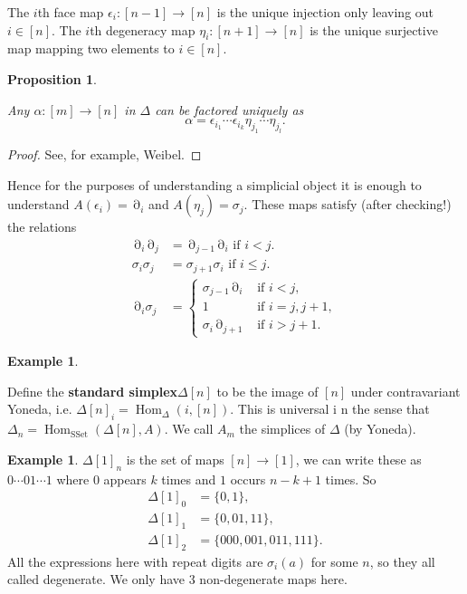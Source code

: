 \documentclass[10pt,]{book}
\newcommand{\lt}{<}
\newcommand{\gt}{>}
\newcommand{\terminology}[1]{\textbf{#1}}
\theoremstyle{plain}
\newtheorem{proposition}[theorem]{Proposition}
\theoremstyle{definition}
\newtheorem{example}[theorem]{Example}
\numberwithin{equation}{section}
\DeclareMathOperator{\Hom}{Hom}
\DeclareMathOperator{\SSet}{\text{SSet}}
\DeclareMathOperator{\dd}{\partial}
\begin{document}
          The \(i\)th face map \(\epsilon_i\colon[n-1] \to [n]\) is the unique injection only leaving out \(i \in [n]\).
          The \(i\)th degeneracy map \(\eta_i\colon [n+1] \to [n]\) is the unique surjective map mapping two elements to \(i\in [n]\).
\begin{proposition}\label{proposition-2}

            Any \(\alpha\colon [m] \to [n]\) in \(\Delta\) can be factored uniquely as
            \[
              \alpha = \epsilon_{i_1}\cdots \epsilon_{i_k}\eta_{j_1}\cdots \eta_{j_l}.
            \]\end{proposition}
\begin{proof}
See, for example, Weibel.\end{proof}
\par

          Hence for the purposes of understanding a simplicial object it is enough to understand \(A(\epsilon_i) = \dd_i\) and \(A(\eta_j) = \sigma_j\).
          These maps satisfy (after checking!) the relations
          \begin{align*}
\dd_i\dd_j &= \dd_{j-1}\dd_i \text{ if } i \lt j.\\
\sigma_i\sigma_j &= \sigma_{j+1}\sigma_i \text{ if } i \leq j.\\
\dd_i\sigma_j &= \begin{cases}\sigma_{j-1}\dd_i & \text{ if } i \lt j, \\ 1 &\text{ if } i=j,j+1,\\\sigma_i\dd_{j+1} &\text{ if }i \gt j + 1.\end{cases}
\end{align*}
\begin{example}\label{example-16}

            Define the \terminology{standard simplex}\(\Delta[n]\) to be the image of \([n]\) under contravariant Yoneda, i.e. \(\Delta[n]_i = \Hom_{\Delta}(i,[n])\).
            This is universal i n the sense that \(\Delta_n = \Hom_{\SSet}(\Delta[n], A)\).
            We call \(A_m\) the simplices of \(\Delta\) (by Yoneda).
          \end{example}
\begin{example}\label{example-17}
\(\Delta[1]_n\) is the set of maps \([n] \to [1]\), we can write these as \(0\cdots 0 1\cdots 1\) where \(0\) appears \(k\) times and \(1\) occurs \(n-k +1\) times.
            So
            \begin{align*}
\Delta[1]_0 &= \{0, 1\},\\
\Delta[1]_1 &= \{0, 01, 11\},\\
\Delta[1]_2 &= \{000, 001, 011, 111\}.
\end{align*}
            All the expressions here with repeat digits are \(\sigma_i(a)\) for some \(n\), so they all called degenerate.
            We only have 3 non-degenerate maps here.
            \end{example}
\typeout{************************************************}
\typeout{************************************************}
\end{document}
